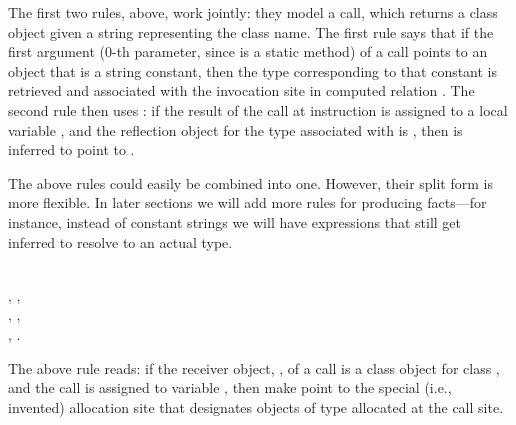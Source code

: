 \noindent The first two rules, above, work jointly: they model a
 call, which returns a class object given a string
representing the class name. The first rule says that if the first
argument (0-th parameter, since  is a static method) of
a  call points to an object that is a string constant,
then the type corresponding to that constant is retrieved and
associated with the invocation site in computed relation
.  The second rule then uses
: if the result of the  call at
instruction  is assigned to a local variable , and the
reflection object for the type associated with  is ,
then  is inferred to point to .

The above rules could easily be combined into one. However, their
split form is more flexible. In later sections we will add more
rules for producing  facts---for
instance, instead of constant strings we will have expressions that
still get inferred to resolve to an actual type.


\begin{minipage}{0.95\columnwidth}
  \begin{rules}
     
    \\
    \tab {}, ,
    \\
    \tab {}, ,
    \\
    \tab {}, .\\
  \end{rules}
\end{minipage}

\noindent The above rule reads: if the receiver object, , of a
 call is a class object for class , and the
 call is assigned to variable , then make
 point to the special (i.e., invented) allocation site  that designates
objects of type  allocated at the  call site.

